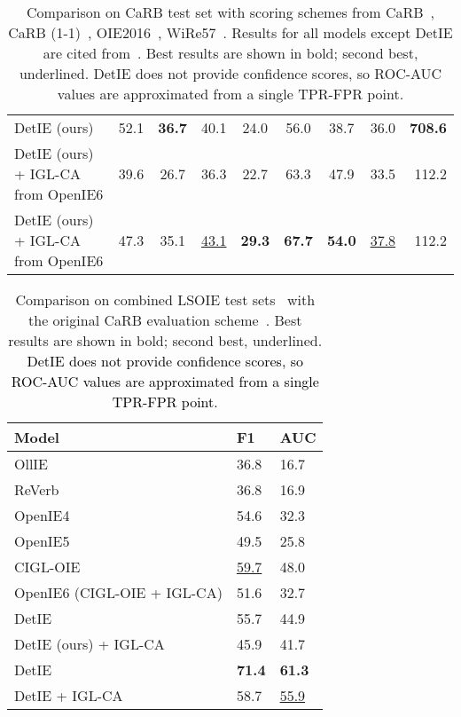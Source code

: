 \documentclass[letterpaper]{article} \usepackage{aaai22}  \usepackage{times}  \usepackage{helvet}  \usepackage{courier}  \usepackage[hyphens]{url}  \usepackage{graphicx} \usepackage{placeins}
\newcommand{\added}[1]{\textcolor{black}{#1}}
\begin{document}
\begin{table*}[t]
\begin{tabular}{l|cc|cc|cc|c|r}
        DetIE  (ours)& 52.1 & \textbf{36.7}\textsuperscript{} & 40.1 & 24.0\textsuperscript{} & 56.0 & 38.7\textsuperscript{} & 36.0 & \textbf{708.6}  \\ 
        DetIE  (ours) + IGL-CA from OpenIE6 &  39.6 & 26.7\textsuperscript{} & 36.3 & 22.7\textsuperscript{} & 63.3 & 47.9\textsuperscript{} & 33.5 &  112.2\\ 
        DetIE  (ours) + IGL-CA from OpenIE6 & 47.3 & 35.1\textsuperscript{} & \underline{43.1} & \textbf{29.3}\textsuperscript{} & \textbf{67.7} & \textbf{54.0}\textsuperscript{} & \underline{37.8} & 112.2 \\ 
        \bottomrule
    \end{tabular}
    \caption{Comparison on CaRB test set with scoring schemes from CaRB~\cite{bhardwaj-etal-2019-carb}, CaRB (1-1)~\cite{kolluru2020openie6}, OIE2016~\cite{Stanovsky2016EMNLP}, WiRe57~\cite{lechelle2019wire57}. Results for all models except DetIE are cited from~\cite{kolluru2020openie6}. 
    Best results are shown in bold; second best, underlined. DetIE does not provide confidence scores, so ROC-AUC values are approximated from a single TPR-FPR point.}
    \label{tab:carb}
\end{table*}



\begin{table}[!t]
    \centering\small
    \setlength{\tabcolsep}{7pt}
    \begin{tabular}{l|ll} \toprule
         Model & {F1} & {AUC} \\ \hline
        OllIE~\cite{ollie-emnlp12} & 36.8 & 16.7 \\
        ReVerb~\cite{fader2011identifying} & 36.8 & 16.9 \\
        OpenIE4 & 54.6  & 32.3 \\
        OpenIE5 & 49.5  & 25.8 \\ 
        CIGL-OIE & \underline{59.7}  & 48.0 \\
        OpenIE6 (CIGL-OIE + IGL-CA) & 51.6 & 32.7\\ \hline 
        DetIE & 55.7 & 44.9 \\
        DetIE  (ours)  + IGL-CA & 45.9 & 41.7 \\ 
        DetIE & \textbf{71.4} & \textbf{61.3} \\ 
        DetIE + IGL-CA & 58.7 & \underline{55.9} \\ 
        \bottomrule
    \end{tabular}
    \caption{Comparison on combined LSOIE test sets~\cite{lsoie-2021} with the original CaRB evaluation scheme~\cite{bhardwaj-etal-2019-carb}. 
    Best results are shown in bold; second best, underlined. \added{DetIE does not provide confidence scores, so ROC-AUC values are approximated from a single TPR-FPR point.}}
    \label{tab:lsoie_table}
\end{table}
\end{document}
